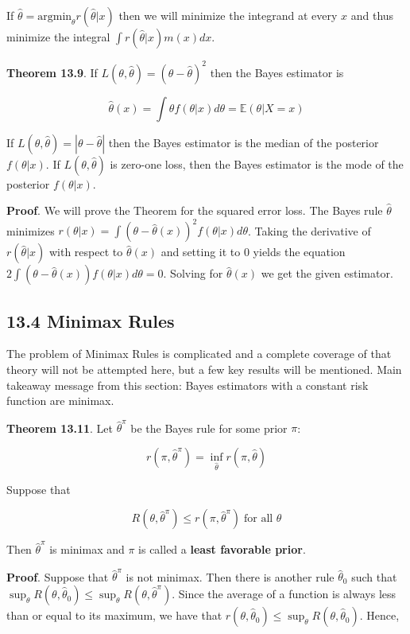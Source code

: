 If \(\hat{\theta} = \text{argmin}_\theta r(\hat{\theta} | x)\) then we
will minimize the integrand at every \(x\) and thus minimize the
integral \(\int r(\hat{\theta} | x)m(x) dx\).

\textbf{Theorem 13.9}. If
\(L(\theta, \hat{\theta}) = (\theta - \hat{\theta})^{2}\) then the Bayes
estimator is

\[\hat{\theta}(x) = \int \theta f(\theta | x) d\theta = \mathbb{E}(\theta | X = x)\]

If \(L(\theta, \hat{\theta}) = |\theta - \hat{\theta}|\) then the Bayes
estimator is the median of the posterior \(f(\theta | x)\). If
\(L(\theta, \hat{\theta})\) is zero-one loss, then the Bayes estimator
is the mode of the posterior \(f(\theta | x)\).

\textbf{Proof}. We will prove the Theorem for the squared error loss.
The Bayes rule \(\hat{\theta}\) minimizes
\(r(\theta | x) = \int (\theta - \hat{\theta}(x))^{2} f(\theta | x) d\theta\).
Taking the derivative of \(r(\hat{\theta} | x)\) with respect to
\(\hat{\theta}(x)\) and setting it to 0 yields the equation
\(2 \int (\theta - \hat{\theta}(x)) f(\theta | x) d\theta = 0\). Solving
for \(\hat{\theta}(x)\) we get the given estimator.

\subsection*{13.4 Minimax Rules}\label{minimax-rules}

The problem of Minimax Rules is complicated and a complete coverage of
that theory will not be attempted here, but a few key results will be
mentioned. Main takeaway message from this section: Bayes estimators
with a constant risk function are minimax.

\textbf{Theorem 13.11}. Let \(\hat{\theta}^\pi\) be the Bayes rule for
some prior \(\pi\):

\[r(\pi, \hat{\theta}^\pi) = \inf_{\hat{\theta}} r(\pi, \hat{\theta})\]

Suppose that

\[R(\theta, \hat{\theta}^\pi) \leq r(\pi, \hat{\theta}^\pi) \;\text{for all } \theta\]

Then \(\hat{\theta}^\pi\) is minimax and \(\pi\) is called a
\textbf{least favorable prior}.

\textbf{Proof}. Suppose that \(\hat{\theta}^\pi\) is not minimax. Then
there is another rule \(\hat{\theta}_{0}\) such that
\(\sup_\theta R(\theta, \hat{\theta}_{0}) \leq \sup_\theta R(\theta, \hat{\theta}^\pi)\).
Since the average of a function is always less than or equal to its
maximum, we have that
\(r(\theta, \hat{\theta}_{0}) \leq \sup_\theta R(\theta, \hat{\theta}_{0})\).
Hence,

